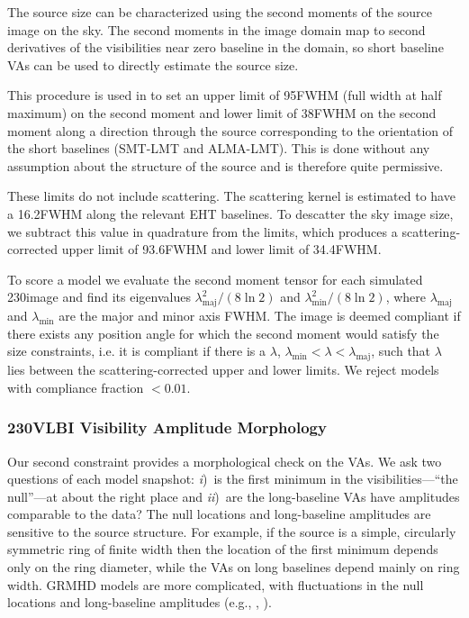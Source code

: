 The source size can be characterized using the second moments of the
source image on the sky.
The second moments in the image domain map to second derivatives of
the visibilities near zero baseline in the \uv domain, so short
baseline VAs can be used to directly estimate the source size.

This procedure is used in  to set an upper limit
of 95\uas FWHM (full width at half maximum) on the second moment and lower limit of 38\uas FWHM on the second moment along a direction
through the source corresponding to the orientation of the short
baselines (SMT-LMT and ALMA-LMT). This is done without any assumption about the structure of the source and is therefore quite permissive.

These limits do not include scattering.  The scattering kernel is estimated to have a 16.2\uas FWHM along the relevant EHT baselines. To descatter the sky image size, we subtract this value in quadrature from the limits, which produces a scattering-corrected upper limit of 93.6\uas FWHM and lower limit of 34.4\uas FWHM.

To score a model we evaluate the second moment tensor for each
simulated 230\GHz image and find its eigenvalues
$\lambda_\mathrm{maj}^2/(8\ln 2)$ and $\lambda_\mathrm{min}^2/(8\ln
2)$, where $\lambda_\mathrm{maj}$ and $\lambda_\mathrm{min}$ are the
major and minor axis FWHM.
The image is deemed compliant if there exists any position angle for which the second moment would satisfy the size constraints, i.e. it is compliant if there is a $\lambda$,  $\lambda_\mathrm{min} < \lambda < \lambda_\mathrm{maj}$, such that $\lambda$ lies between the scattering-corrected upper and lower limits.  
We reject models with compliance fraction $< 0.01$.

\subsubsection{230\GHz VLBI Visibility Amplitude Morphology}

Our second constraint provides a morphological check on the VAs.
We ask two questions of each model snapshot:
\emph{i})~is the first minimum in the visibilities---``the null''---at about the right place and
\emph{ii})~are the long-baseline VAs have amplitudes comparable to the data?
The null locations and long-baseline amplitudes are sensitive to
the source structure.
For example, if the source is a simple, circularly symmetric ring of
finite width then the location of the first minimum depends only on
the ring diameter, while the VAs on long baselines depend mainly on
ring width.
GRMHD models are more complicated, with fluctuations in the null locations and long-baseline amplitudes (e.g., \citealt{2018ApJ...856..163M}, ).

